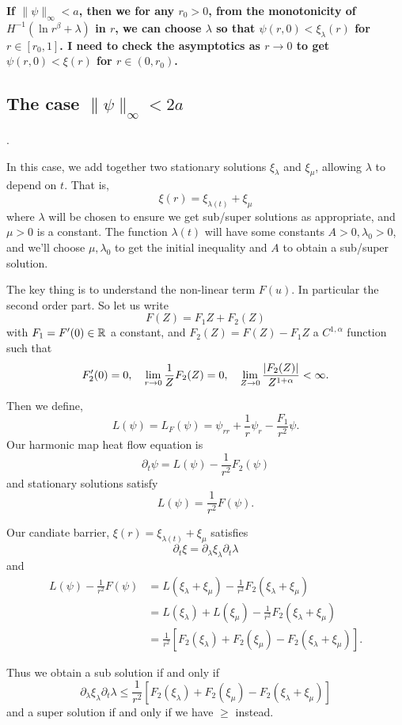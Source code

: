 \documentclass{amsart}
\begin{document}
\textbf{If \(\|\psi\|_{\infty} < a\), then we for any \(r_0 > 0\), from the monotonicity of \(H^{-1} (\ln r^{\beta} + \lambda)\) in \(r\), we can choose \(\lambda\) so that \(\psi(r, 0) < \xi_{\lambda}(r)\) for \(r \in [r_0, 1]\). I need to check the asymptotics as \(r\to 0\) to get \(\psi(r, 0) < \xi(r)\) for \(r \in (0, r_0)\).}

\subsection{The case \(\|\psi\|_{\infty} < 2a\)}.

In this case, we add together two stationary solutions \(\xi_{\lambda}\) and \(\xi_{\mu}\), allowing \(\lambda\) to depend on \(t\). That is,
\[
\xi(r) = \xi_{\lambda(t)} + \xi_{\mu}
\]
where \(\lambda\) will be chosen to ensure we get sub/super solutions as appropriate, and \(\mu > 0\) is a constant. The function \(\lambda(t)\) will have some constants \(A > 0, \lambda_0 > 0\), and we'll choose \(\mu, \lambda_0\) to get the initial inequality and \(A\) to obtain a sub/super solution.

The key thing is to understand the non-linear term \(F(u)\). In particular the second order part. So let us write
\[
F(Z) = F_1 Z + F_2(Z)
\]
with \(F_1 = F'(0) \in \mathbb{R}\) a constant, and \(F_2(Z) = F(Z) - F_1 Z\) a \(C^{1,\alpha}\) function such that
\[
F_2'(0) = 0, \quad \lim_{r\to 0} \frac{1}{Z} F_2(Z) = 0, \quad \lim_{Z\to 0} \frac{\left|{F_2(Z)}\right|}{Z^{1+\alpha}} < \infty.
\]

Then we define,
\[
L(\psi) = L_F(\psi) = \psi_{rr} + \frac{1}{r} \psi_r - \frac{F_1}{r^2} \psi.
\]
Our harmonic map heat flow equation is
\[
\partial_t \psi = L(\psi) - \frac{1}{r^2} F_2(\psi)
\]
and stationary solutions satisfy
\[
L(\psi) = \frac{1}{r^2} F(\psi).
\]

Our candiate barrier, \(\xi(r) = \xi_{\lambda(t)} + \xi_{\mu}\) satisfies
\[
\partial_t \xi = \partial_{\lambda} \xi_{\lambda} \partial_t \lambda
\]
and
\[
\begin{split}
L(\psi) - \frac{1}{r^2} F(\psi) &= L(\xi_{\lambda} + \xi_{\mu}) - \frac{1}{r^2} F_2(\xi_{\lambda} + \xi_{\mu}) \\
&= L(\xi_{\lambda}) + L(\xi_{\mu}) - \frac{1}{r^2} F_2(\xi_{\lambda} + \xi_{\mu}) \\
&= \frac{1}{r^2}\left[F_2(\xi_{\lambda}) + F_2(\xi_{\mu}) - F_2(\xi_{\lambda} + \xi_{\mu})\right].
\end{split}
\]

Thus we obtain a sub solution if and only if
\[
\partial_{\lambda} \xi_{\lambda} \partial_t \lambda \leq \frac{1}{r^2}\left[F_2(\xi_{\lambda}) + F_2(\xi_{\mu}) - F_2(\xi_{\lambda} + \xi_{\mu})\right]
\]
and a super solution if and only if we have \(\geq\) instead.
\end{document}
